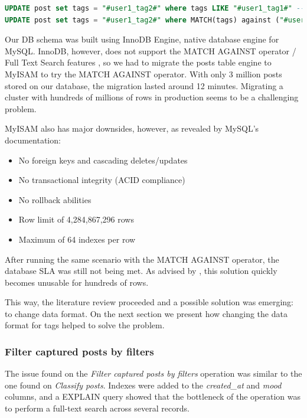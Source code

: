 \begin{lstlisting}[language=SQL,firstnumber=1, caption=A new operator - MATCH AGAINST, label=new-sql-operator-match-against]
UPDATE post set tags = "#user1_tag2#" where tags LIKE "#user1_tag1#" -- old sentence
UPDATE post set tags = "#user1_tag2#" where MATCH(tags) against ("#user1_tag1#" IN BOOLEAN MODE) -- new sentence
\end{lstlisting} 

Our DB schema was built using InnoDB Engine, native database engine for MySQL. InnoDB, however, does not support the MATCH AGAINST operator / Full Text Search features \cite{ftsmysql}, so we had to migrate the posts table engine to MyISAM to try the MATCH AGAINST operator. With only 3 million posts stored on our database, the migration lasted around 12 minutes. Migrating a cluster with hundreds of millions of rows in production seems to be a challenging problem. 

MyISAM also has major downsides, however, as revealed by MySQL's documentation: 
\begin{itemize}
\item{No foreign keys and cascading deletes/updates}
\item{No transactional integrity (ACID compliance)}
\item{No rollback abilities}
\item{Row limit of 4,284,867,296 rows}
\item{Maximum of 64 indexes per row}
\end{itemize}
	

After running the same scenario with the MATCH AGAINST operator, the database SLA was still not being met. As advised by \cite{stackoverflowmatch}, this solution quickly becomes unusable for hundreds of rows. 

This way, the literature review proceeded and a possible solution was emerging: to change data format. On the next section we present how changing the data format for tags helped to solve the problem.  



\subsubsection{Filter captured posts by filters}
The issue found on the \textit{Filter captured posts by filters} operation was similar to the one found on \textit{Classify posts}. Indexes were added to the \textit{created\_at} and \textit{mood} columns, and a EXPLAIN query showed that the bottleneck of the operation was to perform a full-text search across several records. 

